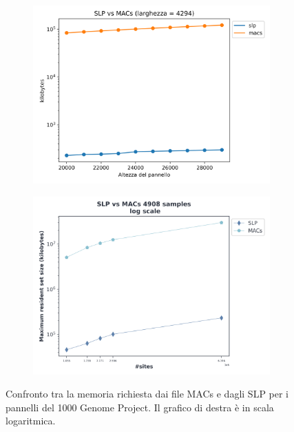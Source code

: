 \begin{figure}
  \centering
  \begin{subfigure}{.5\textwidth}
    \centering
    \includegraphics[width=\linewidth]{img/slp_vs_macs.png}
  \end{subfigure}%
  \begin{subfigure}{.5\textwidth}
    \centering
    \includegraphics[width=\linewidth]{img/slp_vs_macs_log.png}
  \end{subfigure}
  \caption{Confronto tra la memoria richiesta dai file MACs e dagli SLP per i
    pannelli del 1000 Genome Project. Il grafico di destra è in scala
    logaritmica.} 
  \label{fig:slpmacschr}
\end{figure}
